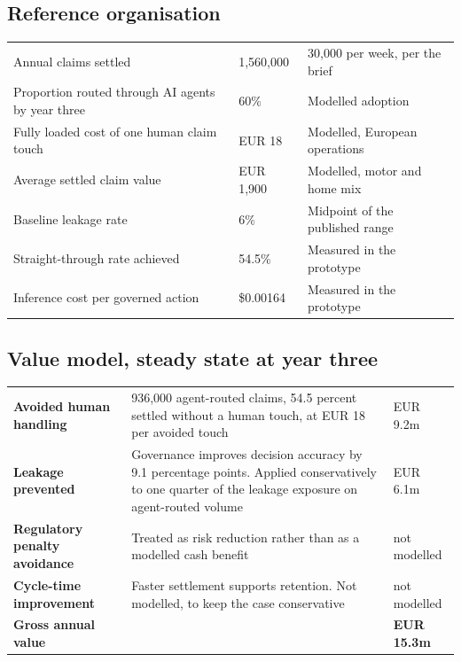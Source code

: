\documentclass[10pt]{article}
\begin{document}
\subsection{Reference organisation}

\vspace{2pt}
{\small
\begin{xltabular}{\textwidth}{@{}YR{0.16\textwidth}L{0.26\textwidth}@{}}
\toprule
{} &  &  \\
\midrule
Annual claims settled & 1,560,000 & 30,000 per week, per the brief \\
Proportion routed through AI agents by year three & 60\% & Modelled adoption \\
Fully loaded cost of one human claim touch & EUR 18 & Modelled, European operations \\
Average settled claim value & EUR 1,900 & Modelled, motor and home mix \\
Baseline leakage rate & 6\% & Midpoint of the published range \\
Straight-through rate achieved & 54.5\% & \textcolor{ok}{Measured in the prototype} \\
Inference cost per governed action & \$0.00164 & \textcolor{ok}{Measured in the prototype} \\
\bottomrule
\end{xltabular}}

\subsection{Value model, steady state at year three}

\vspace{2pt}
{\small
\begin{xltabular}{\textwidth}{@{}L{0.24\textwidth}YR{0.16\textwidth}@{}}
\toprule
{} &  &  \\
\midrule
\textbf{Avoided human handling} & 936,000 agent-routed claims, 54.5 percent settled without a human touch, at EUR 18 per avoided touch & EUR 9.2m \\
\textbf{Leakage prevented} & Governance improves decision accuracy by 9.1 percentage points. Applied conservatively to one quarter of the leakage exposure on agent-routed volume & EUR 6.1m \\
\textbf{Regulatory penalty avoidance} & Treated as risk reduction rather than as a modelled cash benefit & {\color{ink3}not modelled} \\
\textbf{Cycle-time improvement} & Faster settlement supports retention. Not modelled, to keep the case conservative & {\color{ink3}not modelled} \\
\midrule
\textbf{Gross annual value} & & \textbf{EUR 15.3m} \\
\bottomrule
\end{xltabular}}
\end{document}
